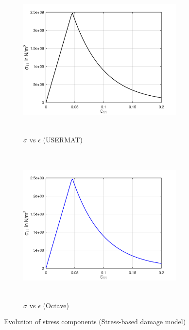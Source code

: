 \documentclass[12pt,a4paper,twoside,openright]{report}
\begin{document}
\begin{figure}[htbp!]
     \captionsetup[subfigure]{justification=centering}
     \begin{subfigure}{0.4\textwidth}
         \includegraphics[width=8.3cm,height=8cm,keepaspectratio]{22.StressvsStrain_Ansys.png}
         \caption{$\sigma$ vs $\epsilon$ (USERMAT)}
         \label{fig:Stress-Strain relation in Ansys2}
     \end{subfigure}
     \hspace{1.8cm}
     \begin{subfigure}{0.4\textwidth}
          \includegraphics[width=8.3cm,height=8cm,keepaspectratio]{22.StressvsStrain_Octave.png}
         \caption{$\sigma$ vs $\epsilon$ (Octave)}
         \label{fig:Stress-Strain relation Octave2}
     \end{subfigure}
     \caption{Evolution of stress components (Stress-based damage model)}

\end{figure}
\FloatBarrier
\end{document}
